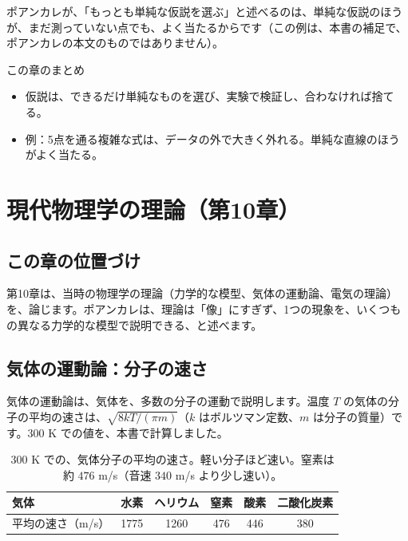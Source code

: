 \documentclass[a4paper,11pt,openany]{ltjsbook}
\begin{document}
ポアンカレが、「もっとも単純な仮説を選ぶ」と述べるのは、単純な仮説のほうが、まだ測っていない点でも、よく当たるからです（この例は、本書の補足で、ポアンカレの本文のものではありません）。

\begin{pointbox}{この章のまとめ}
\begin{itemize}[leftmargin=*]
\item 仮説は、できるだけ単純なものを選び、実験で検証し、合わなければ捨てる。
\item 例：5点を通る複雑な式は、データの外で大きく外れる。単純な直線のほうがよく当たる。
\end{itemize}
\end{pointbox}

\chapter{現代物理学の理論（第10章）}

\section{この章の位置づけ}

第10章は、当時の物理学の理論（力学的な模型、気体の運動論、電気の理論）を、論じます。ポアンカレは、理論は「像」にすぎず、1つの現象を、いくつもの異なる力学的な模型で説明できる、と述べます。

\section{気体の運動論：分子の速さ}

気体の運動論は、気体を、多数の分子の運動で説明します。温度 $T$ の気体の分子の平均の速さは、$\sqrt{8kT/(\pi m)}$（$k$ はボルツマン定数、$m$ は分子の質量）です。$300$ K での値を、本書で計算しました。

\begin{table}[htbp]
\centering
\begin{tabular}{l|ccccc}
\toprule
気体 & 水素 & ヘリウム & 窒素 & 酸素 & 二酸化炭素\\
\midrule
平均の速さ（m/s） & 1775 & 1260 & 476 & 446 & 380\\
\bottomrule
\end{tabular}
\caption{$300$ K での、気体分子の平均の速さ。軽い分子ほど速い。窒素は約 $476$ m/s（音速 $340$ m/s より少し速い）。}
\end{table}
\end{document}
